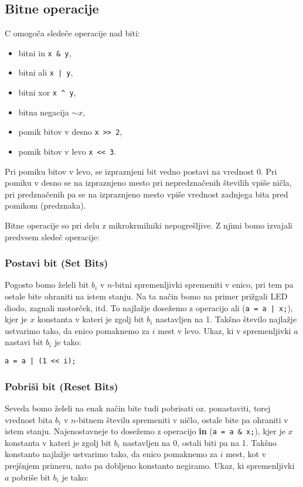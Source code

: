 \documentclass[12pt,letterpaper]{article}
\begin{document}
\subsection*{Bitne operacije}
C omogoča sledeče operacije nad biti:
\begin{itemize}
    \item bitni in \texttt{x  \&  y},
    \item bitni ali \texttt{x  |  y},
    \item bitni xor \texttt{x \^{} y},
    \item bitna negacija \texttt{$\sim x$},
    \item pomik bitov v desno \texttt{x  >>  2},
    \item pomik bitov v levo \texttt{x  <<  3}.
\end{itemize}

Pri pomiku bitov v levo, se izpraznjeni bit vedno postavi na vrednost 0. Pri pomiku v desno se na izpraznjeno mesto pri nepredznačenih številih vpiše ničla, pri predznačenih pa se na izpraznjeno mesto vpiše vrednost zadnjega bita pred pomikom (predznaka).

Bitne operacije so pri delu z mikrokrmilniki nepogrešljive. Z njimi bomo izvajali predvsem sledeč operacije:

\subsubsection*{Postavi bit (Set Bits)}
Pogosto bomo želeli bit $b_i$ v $n$-bitni spremenljivki spremeniti v enico, pri tem pa ostale bite ohraniti na istem stanju. Na ta način bomo na primer prižgali LED diodo, zagnali motorček, itd. To najlažje dosežemo z operacijo ali (\texttt{a = a | x;}), kjer je $x$ konstanta v kateri je zgolj bit $b_i$ nastavljen na 1. Takšno število najlažje ustvarimo tako, da enico pomaknemo za $i$ mest v levo. Ukaz, ki v spremenljivki $a$ nastavi bit $b_i$ je tako:

\begin{center}
\begin{lstlisting}[style=CStyle]
    a = a | (1 << i);
\end{lstlisting}
\end{center}

\subsubsection*{Pobriši bit (Reset Bits)}

Seveda bomo želeli na enak način bite tudi pobrisati oz. ponastaviti, torej vrednost bita $b_i$ v $n$-bitnem številu spremeniti v ničlo, ostale bite pa ohraniti v istem stanju. Najenostavneje to dosežemo z operacijo \textbf{in} (\texttt{a = a \& x;}), kjer je $x$ konstanta v kateri je zgolj bit $b_i$ nastavljen na 0, ostali biti pa na 1. Takšno konstanto najlažje ustvarimo tako, da enico pomaknemo za $i$ mest, kot v prejšnjem primeru, nato pa dobljeno konstanto negiramo. Ukaz, ki spremenljivki $a$ pobriše bit $b_i$ je tako:
\end{document}
